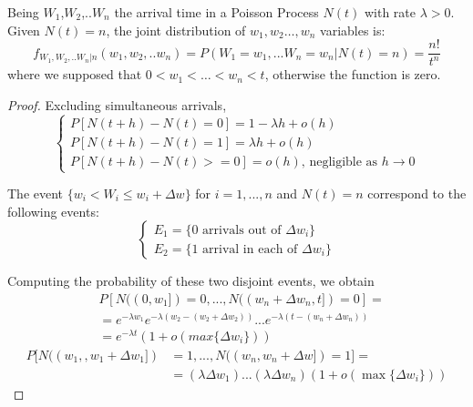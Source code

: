 \begin{theorem}
	Being $W_{1}$,$W_{2}$,..$W_{n}$ the arrival time in a Poisson Process $N(t)$ with rate ${\lambda}>0$. Given $N(t)=n$, the joint distribution of $w_{1},w_{2}\dots,w_{n}$ variables is:
	\begin{equation}
	f_{W_1,W_2,..W_n|n} (w_1,w_2,..w_n) = P (W_1=w_1,...W_n=w_n|N(t)=n) = \frac{n!}{t^n}
	\end{equation}
	where we supposed that $0<w_1<\dots<w_n<t$, otherwise the function is zero.
	\begin{proof}
		Excluding simultaneous arrivals,
		\begin{equation*}
			\begin{cases}
				P[N(t+h)-N(t)=0]= 1 - \lambda h+ o(h) \\
				P[N(t+h)-N(t)=1]= \lambda h+ o(h) \\
				P[N(t+h)-N(t)>=0]= o(h) \text{, negligible as } h\rightarrow 0
			\end{cases}
		\end{equation*}

		The event $ \{w_i<W_i \leq w_i+\Delta w \}$ for $i=1,...,n$ and $N(t)=n$ correspond to the following events:
		\begin{equation*}
			\begin{cases}
				E_1=\{\text{0 arrivals out of } \Delta w_i \} \\
				E_2=\{\text{1 arrival in each of } \Delta w_i \}
			\end{cases}
		\end{equation*}

		Computing the probability of these two disjoint events, we obtain
		\begin{equation}
			\begin{split}
				& P[N((0,w_1])=0,...,N((w_n+\Delta w_n,t])=0] = \\
				& = e^{-\lambda w_1} e^{-\lambda (w_2-(w_2+\Delta w_2))} ... e^{-\lambda (t-(w_n+\Delta w_n))} \\
				& =e^{-\lambda t} (1+o(max\{\Delta w_i\}))
			\end{split}
		\end{equation}
		\begin{equation}
			\begin{split}
				P[N((w_1,,w_1+\Delta w_1]) &=1,...,N((w_n,w_n+\Delta w])=1] =\\
				& = (\lambda \Delta w_1) ... (\lambda \Delta w_n) (1+o(\max\{\Delta w_i\}))
			\end{split}
		\end{equation}


\end{proof}
\end{theorem}

